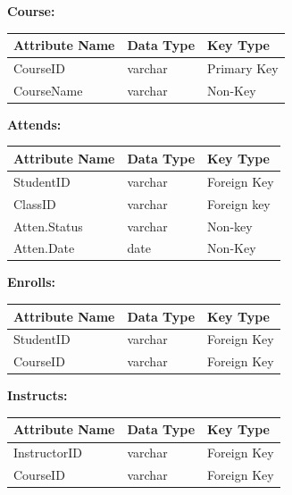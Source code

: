 \documentclass{article}
\begin{document}
\textbf{Course:}
\begin{table}[H]
\centering
\begin{large}
\begin{tabular}{|l|l|l|}
\hline
\textbf{Attribute Name} & \textbf{Data Type} & \textbf{Key Type} \\ \hline
CourseID & varchar & Primary Key \\ \hline
CourseName & varchar & Non-Key\\ \hline
\end{tabular}
\end{large}
\end{table}


\textbf{Attends:}
\begin{table}[H]
\centering
\begin{large}
\begin{tabular}{|l|l|l|}
\hline
\textbf{Attribute Name} & \textbf{Data Type} & \textbf{Key Type} \\ \hline
StudentID & varchar & Foreign Key \\ \hline
ClassID & varchar & Foreign key\\ \hline
Atten.Status & varchar & Non-key\\ \hline
Atten.Date & date & Non-Key\\ \hline
\end{tabular}
\end{large}
\end{table}



\textbf{Enrolls:}
\begin{table}[H]
\centering
\begin{large}
\begin{tabular}{|l|l|l|}
\hline
\textbf{Attribute Name} & \textbf{Data Type} & \textbf{Key Type} \\ \hline
StudentID & varchar & Foreign Key \\ \hline
CourseID & varchar & Foreign Key\\ \hline
\end{tabular}
\end{large}
\end{table}


\textbf{Instructs:}
\begin{table}[H]
\centering
\begin{large}
\begin{tabular}{|l|l|l|}
\hline
\textbf{Attribute Name} & \textbf{Data Type} & \textbf{Key Type} \\ \hline
InstructorID & varchar & Foreign Key \\ \hline
CourseID & varchar & Foreign Key\\ \hline
\end{tabular}
\end{large}
\end{table}
\end{document}
